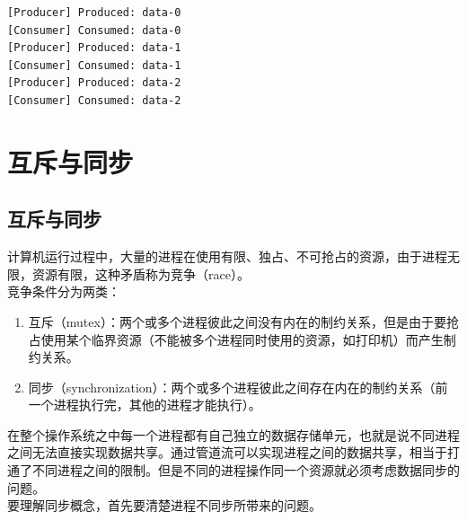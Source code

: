 \begin{tcolorbox}
    \begin{verbatim}
[Producer] Produced: data-0
[Consumer] Consumed: data-0
[Producer] Produced: data-1
[Consumer] Consumed: data-1
[Producer] Produced: data-2
[Consumer] Consumed: data-2
	\end{verbatim}
\end{tcolorbox}

\newpage

\section{互斥与同步}

\subsection{互斥与同步}

计算机运行过程中，大量的进程在使用有限、独占、不可抢占的资源，由于进程无限，资源有限，这种矛盾称为竞争（race）。\\

竞争条件分为两类：

\begin{enumerate}
    \item 互斥（mutex）：两个或多个进程彼此之间没有内在的制约关系，但是由于要抢占使用某个临界资源（不能被多个进程同时使用的资源，如打印机）而产生制约关系。

    \item 同步（synchronization）：两个或多个进程彼此之间存在内在的制约关系（前一个进程执行完，其他的进程才能执行）。
\end{enumerate}

在整个操作系统之中每一个进程都有自己独立的数据存储单元，也就是说不同进程之间无法直接实现数据共享。通过管道流可以实现进程之间的数据共享，相当于打通了不同进程之间的限制。但是不同的进程操作同一个资源就必须考虑数据同步的问题。\\

要理解同步概念，首先要清楚进程不同步所带来的问题。\\


